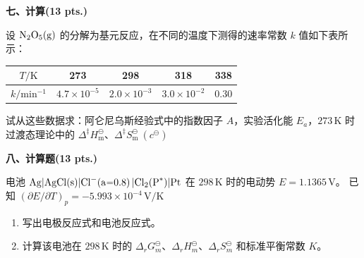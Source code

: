 \vspace{0.5cm}
\noindent\textbf{七、计算(13 pts.)}

设 $\ce{N2O5(g)}$ 的分解为基元反应，在不同的温度下测得的速率常数 $k$ 值如下表所示：

\begin{center}
\begin{tabular}{|c|c|c|c|c|}
\hline
$T/\mathrm{K}$ & 273 & 298 & 318 & 338 \\
\hline
$k/\mathrm{min^{-1}}$ & $4.7\times10^{-5}$ & $2.0\times10^{-3}$ & $3.0\times10^{-2}$ & $0.30$ \\
\hline
\end{tabular}
\end{center}

试从这些数据求：阿仑尼乌斯经验式中的指数因子 $A$，实验活化能 $E_a$，$273\,\mathrm{K}$ 时过渡态理论中的 $\Delta^\ddagger H_\text{m}^\ominus$、$\Delta^\ddagger S_\text{m}^\ominus\ (c^\ominus)$

\vspace{0.5cm}
\noindent\textbf{八、计算题(13 pts.)}

电池 $\ce{Ag|AgCl(s)|Cl^-(a=0.8)|Cl2(P^*)|Pt}$ 在 $298\,\mathrm{K}$ 时的电动势 $E=1.1365\,\mathrm{V}$。
已知 $(\partial E/\partial T)_p=-5.993\times10^{-4}\,\mathrm{V/K}$

\begin{enumerate}
    \item 写出电极反应式和电池反应式。
    \item 计算该电池在 $298\,\mathrm{K}$ 时的 $\Delta_r G_m^\ominus$、$\Delta_r H_m^\ominus$、$\Delta_r S_m^\ominus$ 和标准平衡常数 $K$。
\end{enumerate}